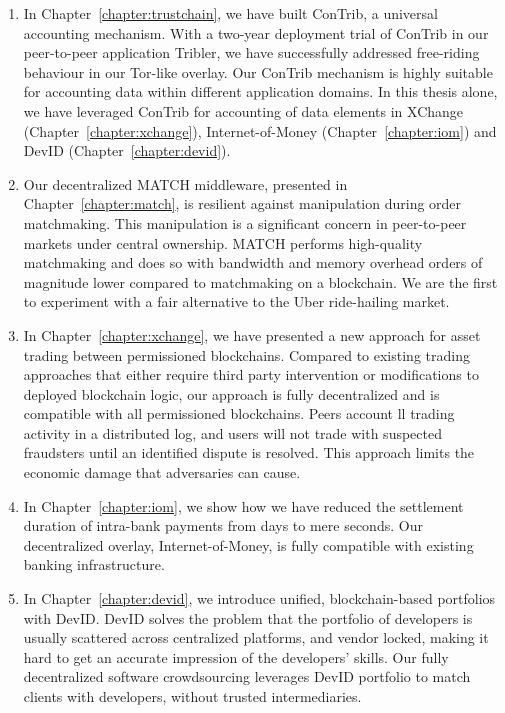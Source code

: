 \begin{enumerate}
	\item In Chapter~\ref{chapter:trustchain}, we have built ConTrib, a universal accounting mechanism.
	With a two-year deployment trial of ConTrib in our peer-to-peer application Tribler, we have successfully addressed free-riding behaviour in our Tor-like overlay.
	Our ConTrib mechanism is highly suitable for accounting data within different application domains.
	In this thesis alone, we have leveraged ConTrib for accounting of data elements in XChange (Chapter~\ref{chapter:xchange}), Internet-of-Money (Chapter~\ref{chapter:iom}) and DevID (Chapter~\ref{chapter:devid}).
	
	\item Our decentralized MATCH middleware, presented in Chapter~\ref{chapter:match}, is resilient against manipulation during order matchmaking.
	This manipulation is a significant concern in peer-to-peer markets under central ownership.
	MATCH performs high-quality matchmaking and does so with bandwidth and memory overhead orders of magnitude lower compared to matchmaking on a blockchain.
	We are the first to experiment with a fair alternative to the Uber ride-hailing market.
	
	\item In Chapter~\ref{chapter:xchange}, we have presented a new approach for asset trading between permissioned blockchains.
	Compared to existing trading approaches that either require third party intervention or modifications to deployed blockchain logic, our approach is fully decentralized and is compatible with all permissioned blockchains.
	Peers account ll trading activity in a distributed log, and users will not trade with suspected fraudsters until an identified dispute is resolved.
	This approach limits the economic damage that adversaries can cause.
	
	\item In Chapter~\ref{chapter:iom}, we show how we have reduced the settlement duration of intra-bank payments from days to mere seconds.
	Our decentralized overlay, Internet-of-Money, is fully compatible with existing banking infrastructure.
	
	\item In Chapter~\ref{chapter:devid}, we introduce unified, blockchain-based portfolios with DevID.
	DevID solves the problem that the portfolio of developers is usually scattered across centralized platforms, and vendor locked, making it hard to get an accurate impression of the developers' skills.
	Our fully decentralized software crowdsourcing leverages DevID portfolio to match clients with developers, without trusted intermediaries.
	

\end{enumerate}
